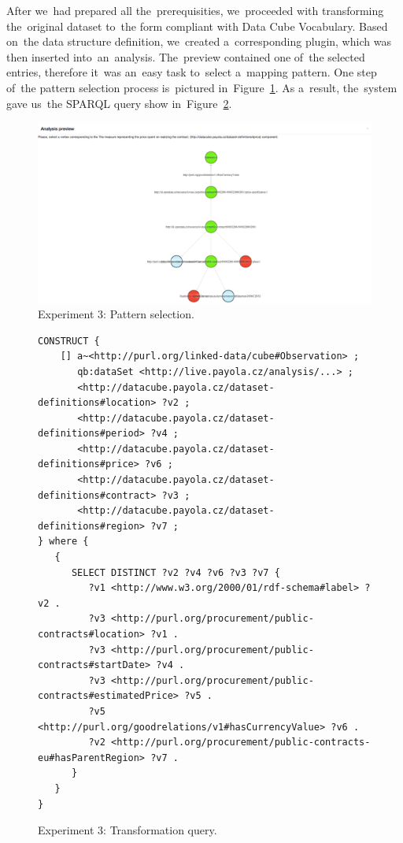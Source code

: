 After we~had prepared all the~prerequisities, we~proceeded with transforming the~original dataset to~the form compliant with Data Cube Vocabulary. Based on~the 
data structure definition, we~created a~corresponding plugin, which was then 
inserted into~an~analysis. The~preview contained one of~the selected entries, 
therefore it~was an~easy task to~select a~mapping pattern. One step of~the 
pattern selection process is~pictured in~Figure~\ref{fig:contracts-pattern}.
As a~result, the~system gave us~the SPARQL query show in~Figure~\ref{fig:contracts-query-pattern}.

\begin{figure}
  \centering
  \includegraphics[width=140mm]{img/contracts-pattern.png}
  \caption{Experiment 3: Pattern selection.}
  \label{fig:contracts-pattern}
\end{figure}

\begin{figure}
  \scriptsize
  \begin{verbatim}
CONSTRUCT {
    [] a~<http://purl.org/linked-data/cube#Observation> ;
       qb:dataSet <http://live.payola.cz/analysis/...> ;
       <http://datacube.payola.cz/dataset-definitions#location> ?v2 ;
       <http://datacube.payola.cz/dataset-definitions#period> ?v4 ;
       <http://datacube.payola.cz/dataset-definitions#price> ?v6 ;
       <http://datacube.payola.cz/dataset-definitions#contract> ?v3 ;
       <http://datacube.payola.cz/dataset-definitions#region> ?v7 ;
} where {
   {
      SELECT DISTINCT ?v2 ?v4 ?v6 ?v3 ?v7 {
         ?v1 <http://www.w3.org/2000/01/rdf-schema#label> ?v2 .
         ?v3 <http://purl.org/procurement/public-contracts#location> ?v1 .
         ?v3 <http://purl.org/procurement/public-contracts#startDate> ?v4 .
         ?v3 <http://purl.org/procurement/public-contracts#estimatedPrice> ?v5 .
         ?v5 <http://purl.org/goodrelations/v1#hasCurrencyValue> ?v6 .
         ?v2 <http://purl.org/procurement/public-contracts-eu#hasParentRegion> ?v7 .
      }
   }
} 
  \end{verbatim}
  \caption{Experiment 3: Transformation query.}
  \label{fig:contracts-query-pattern}
\end{figure}

